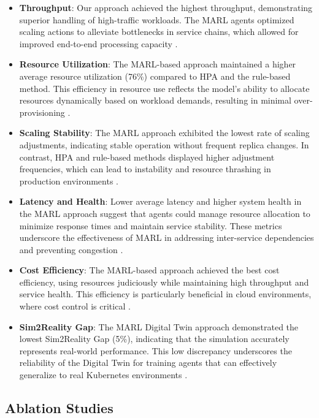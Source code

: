 \documentclass[conference]{IEEEtran}
\begin{document}
\begin{itemize}
    \item \textbf{Throughput}: Our approach achieved the highest throughput, demonstrating superior handling of high-traffic workloads. The MARL agents optimized scaling actions to alleviate bottlenecks in service chains, which allowed for improved end-to-end processing capacity \cite{zhang_marl_k8s}.
    \item \textbf{Resource Utilization}: The MARL-based approach maintained a higher average resource utilization (76\%) compared to HPA and the rule-based method. This efficiency in resource use reflects the model's ability to allocate resources dynamically based on workload demands, resulting in minimal over-provisioning \cite{nguyen_sim2reality}.
    \item \textbf{Scaling Stability}: The MARL approach exhibited the lowest rate of scaling adjustments, indicating stable operation without frequent replica changes. In contrast, HPA and rule-based methods displayed higher adjustment frequencies, which can lead to instability and resource thrashing in production environments \cite{hpa_design}.
    \item \textbf{Latency and Health}: Lower average latency and higher system health in the MARL approach suggest that agents could manage resource allocation to minimize response times and maintain service stability. These metrics underscore the effectiveness of MARL in addressing inter-service dependencies and preventing congestion \cite{tan_nn_resource_approx}.
    \item \textbf{Cost Efficiency}: The MARL-based approach achieved the best cost efficiency, using resources judiciously while maintaining high throughput and service health. This efficiency is particularly beneficial in cloud environments, where cost control is critical \cite{liu_dt_cloud}.
    \item \textbf{Sim2Reality Gap}: The MARL Digital Twin approach demonstrated the lowest Sim2Reality Gap (5\%), indicating that the simulation accurately represents real-world performance. This low discrepancy underscores the reliability of the Digital Twin for training agents that can effectively generalize to real Kubernetes environments \cite{schleich_digital_twin}.
\end{itemize}

\subsection{Ablation Studies}
\end{document}
